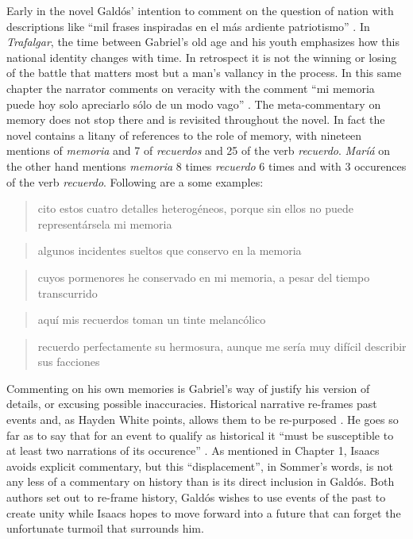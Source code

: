 \documentclass[12pt]{report}
\begin{document}
Early in the novel Galdós' intention to comment on the question of nation with descriptions like \enquote{mil frases inspiradas en el más ardiente patriotismo} \cite[8]{Galdos1882}.
In \textit{Trafalgar}, the time between Gabriel's old age and his youth emphasizes how this national identity changes with time.
In retrospect it is not the winning or losing of the battle that matters most but a man's vallancy in the process.
In this same chapter the narrator comments on veracity with the comment \enquote{mi memoria puede hoy solo apreciarlo sólo de un modo vago} \cite[9]{Galdos1882}.
The meta-commentary on memory does not stop there and is revisited throughout the novel.
In fact the novel contains a litany of references to the role of memory, with nineteen mentions of \textit{memoria} and 7 of \textit{recuerdos} and 25 of the verb \textit{recuerdo}.
\textit{Maríá} on the other hand mentions \textit{memoria} 8 times \textit{recuerdo} 6 times and with 3 occurences of the verb \textit{recuerdo}.
Following are a some examples: 
\blockquote{cito estos cuatro detalles heterogéneos, porque sin ellos no puede representársela mi memoria} \cite[13]{Galdos1882}
\blockquote{algunos incidentes sueltos que conservo en la memoria} \cite[66]{Galdos1882}
\blockquote{cuyos pormenores he conservado en mi memoria, a pesar del tiempo transcurrido}  \cite[392]{Galdos1882}
\blockquote{aquí mis recuerdos toman un tinte melancólico} \cite[426]{Galdos1882}
\blockquote{recuerdo perfectamente su hermosura, aunque me sería muy difícil describir sus facciones}.
Commenting on his own memories is Gabriel's way of justify his version of details, or excusing possible inaccuracies.
Historical narrative re-frames past events and, as Hayden White points, allows them to be re-purposed \cite[18]{White1980}.
He goes so far as to say that for an event to qualify as historical it \enquote{must be susceptible to at least two narrations of its occurence} \cite[23]{White1980}.
As mentioned in Chapter 1, Isaacs avoids explicit commentary, but this \enquote{displacement}, in Sommer's words, is not any less of a commentary on history than is its direct inclusion in Galdós.
Both authors set out to re-frame history, Galdós wishes to use events of the past to create unity while Isaacs hopes to move forward into a future that can forget the unfortunate turmoil that surrounds him.
\end{document}
